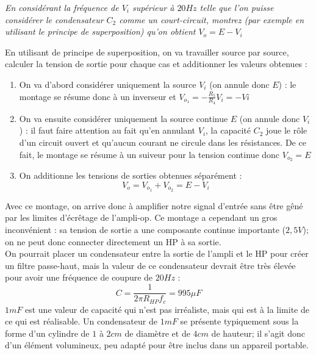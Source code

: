 {
\textit{En considérant la fréquence de $V_i$ supérieur à $20Hz$ telle que l'on puisse considérer le condensateur $C_2$ comme un court-circuit, montrez (par exemple en utilisant le principe de superposition) qu'on obtient $V_o = E - V_i$}
}
{%
En utilisant de principe de superposition, on va travailler source par source, calculer la tension de sortie pour chaque cas et additionner les valeurs obtenues :
\begin{enumerate}
\item On va d'abord considérer uniquement la source $V_i$ (on annule donc $E$) : le montage se résume donc à un inverseur et $V_{o_1} = -\frac{R_5}{R_4}V_i = -Vi$
\item On va ensuite considérer uniquement la source continue $E$ (on annule donc $V_i$) : il faut faire attention au fait qu'en annulant $V_i$, la capacité $C_2$ joue le rôle d'un circuit ouvert et qu'aucun courant ne circule dans les résistances. De ce fait, le montage se résume à un suiveur pour la tension continue donc $V_{o_2} = E$
\item On additionne les tensions de sorties obtenues séparément :
$$V_o = V_{o_1} + V_{o_2} = E - V_i$$
\end{enumerate}
}

Avec ce montage, on arrive donc à amplifier notre signal d'entrée sans être gêné par les limites d'écrêtage de l'ampli-op. Ce montage a cependant un gros inconvénient : sa tension de sortie a une composante continue importante ($2,5V$); on ne peut donc connecter directement un HP à sa sortie.\\
On pourrait placer un condensateur entre la sortie de l'ampli et le HP pour créer un filtre passe-haut, mais la valeur de ce condensateur devrait être très élevée pour avoir une fréquence de coupure de $20Hz$ :
$$C=\frac{1}{2 \pi R_{HP} f_c}=995\mu F$$
$1mF$ est une valeur de capacité qui n'est pas irréaliste, mais qui est à la limite de ce qui est réalisable. Un condensateur de $1mF$ se présente typiquement sous la forme d'un cylindre de $1$ à $2cm$ de diamètre et de $4cm$ de hauteur; il s'agit donc d'un élément volumineux, peu adapté pour être inclus dans un appareil portable.
\newpage

